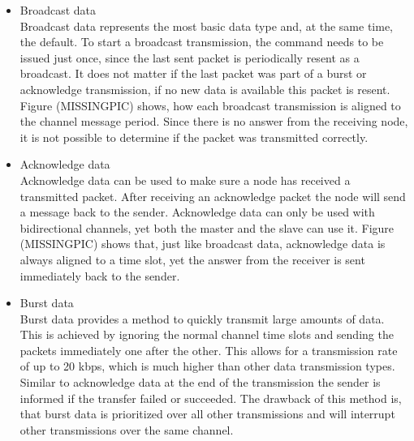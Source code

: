 \begin{itemize}
	\item{Broadcast data} \hfill \\ Broadcast data represents the most basic data type and, at the same time, the default. To start a broadcast transmission, the command needs to be issued just once, since the last sent packet is periodically resent as a broadcast. It does not matter if the last packet was part of a burst or acknowledge transmission, if no new data is available this packet is resent. Figure (MISSINGPIC) shows, how each broadcast transmission is aligned to the channel message period.	Since there is no answer from the receiving node, it is not possible to determine if the packet was transmitted correctly.

	\item{Acknowledge data} \hfill \\ Acknowledge data can be used to make sure a node has received a transmitted packet. After receiving an acknowledge packet the node will send a message back to the sender. Acknowledge data can only be used with bidirectional channels, yet both the master and the slave can use it. Figure (MISSINGPIC) shows that, just like broadcast data, acknowledge data is always aligned to a time slot, yet the answer from the receiver is sent immediately back to the sender.
	
	\item{Burst data} \hfill \\ Burst data provides a method to quickly transmit large amounts of data. This is achieved by ignoring the normal channel time slots and sending the packets immediately one after the other. This allows for a transmission rate of up to 20 kbps, which is much higher than other data transmission types. Similar to acknowledge data at the end of the transmission the sender is informed if the transfer failed or succeeded. The drawback of this method is, that burst data is prioritized over all other transmissions and will interrupt other transmissions over the same channel.
\end{itemize}

